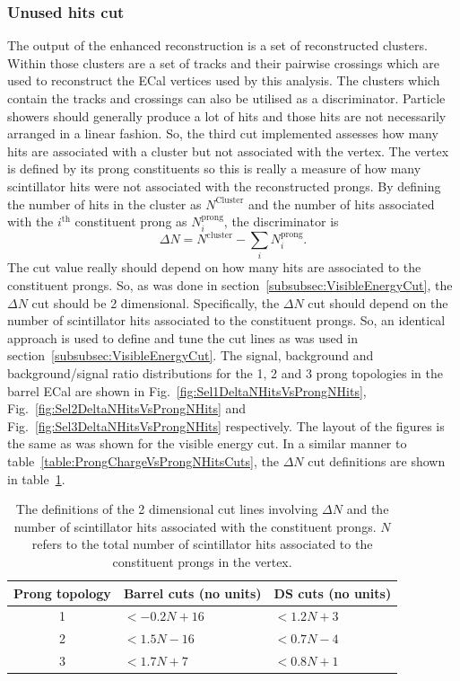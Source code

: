 \subsubsection{Unused hits cut}
\label{subsubsec:UnusedHitsCuts}
The output of the enhanced reconstruction is a set of reconstructed clusters.  Within those clusters are a set of tracks and their pairwise crossings which are used to reconstruct the ECal vertices used by this analysis.  The clusters which contain the tracks and crossings can also be utilised as a discriminator.  Particle showers should generally produce a lot of hits and those hits are not necessarily arranged in a linear fashion.  So, the third cut implemented assesses how many hits are associated with a cluster but not associated with the vertex.  The vertex is defined by its prong constituents so this is really a measure of how many scintillator hits were not associated with the reconstructed prongs.  By defining the number of hits in the cluster as $N^{\textrm{Cluster}}$ and the number of hits associated with the $i^{\textrm{th}}$ constituent prong as $N^{\textrm{prong}}_i$, the discriminator is
\begin{equation}
  \Delta N = N^{\textrm{cluster}} - \sum_i N^{\textrm{prong}}_i.
  \label{eqn:DeltaNHits}
\end{equation}
The cut value really should depend on how many hits are associated to the constituent prongs.  So, as was done in section~\ref{subsubsec:VisibleEnergyCut}, the $\Delta N$ cut should be 2 dimensional.  Specifically, the $\Delta N$ cut should depend on the number of scintillator hits associated to the constituent prongs.
\newline
\newline
So, an identical approach is used to define and tune the cut lines as was used in section~\ref{subsubsec:VisibleEnergyCut}.  The signal, background and background/signal ratio distributions for the 1, 2 and 3 prong topologies in the barrel ECal are shown in Fig.~\ref{fig:Sel1DeltaNHitsVsProngNHits}, Fig.~\ref{fig:Sel2DeltaNHitsVsProngNHits} and Fig.~\ref{fig:Sel3DeltaNHitsVsProngNHits} respectively.  The layout of the figures is the same as was shown for the visible energy cut.  In a similar manner to table~\ref{table:ProngChargeVsProngNHitsCuts}, the $\Delta N$ cut definitions are shown in table~\ref{table:DeltaNHitsVsProngNHitsCuts}.
\begin{table}[!b]
  \begin{tabular}{ c l l }
    Prong topology & Barrel cuts (no units) & DS cuts (no units) \\ \hline \hline
    1 & $<-0.2N + 16$ & $<1.2N + 3$ \\
    2 & $<1.5N - 16$ & $<0.7N - 4$ \\
    3 & $<1.7N + 7$ & $<0.8N + 1$ \\
  \end{tabular}
  \caption{The definitions of the 2 dimensional cut lines involving $\Delta N$ and the number of scintillator hits associated with the constituent prongs. $N$ refers to the total number of scintillator hits associated to the constituent prongs in the vertex.}
  \label{table:DeltaNHitsVsProngNHitsCuts}
\end{table}

